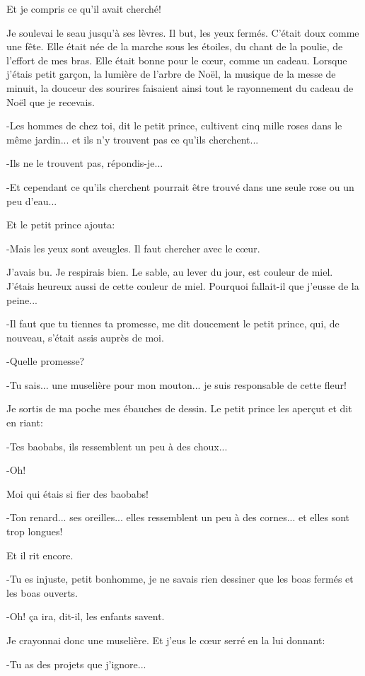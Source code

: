 \documentclass{report}
\begin{document}
Et je compris ce qu'il avait cherché!

Je soulevai le seau jusqu'à ses lèvres. Il but, les yeux fermés. C'était doux comme une fête. Elle était née de la marche sous les étoiles, du chant de la poulie, de l'effort de mes bras. Elle était bonne pour le cœur, comme un cadeau. Lorsque j'étais petit garçon, la lumière de l'arbre de Noël, la musique de la messe de minuit, la douceur des sourires faisaient ainsi tout le rayonnement du cadeau de Noël que je recevais.

-Les hommes de chez toi, dit le petit prince, cultivent cinq mille roses dans le même jardin... et ils n'y trouvent pas ce qu'ils cherchent...

-Ils ne le trouvent pas, répondis-je...

-Et cependant ce qu'ils cherchent pourrait être trouvé dans une seule rose ou un peu d'eau...

Et le petit prince ajouta:

-Mais les yeux sont aveugles. Il faut chercher avec le cœur.

J'avais bu. Je respirais bien. Le sable, au lever du jour, est couleur de miel. J'étais heureux aussi de cette couleur de miel. Pourquoi fallait-il que j'eusse de la peine...

-Il faut que tu tiennes ta promesse, me dit doucement le petit prince, qui, de nouveau, s'était assis auprès de moi.

-Quelle promesse?

-Tu sais... une muselière pour mon mouton... je suis responsable de cette fleur!

Je sortis de ma poche mes ébauches de dessin. Le petit prince les aperçut et dit en riant:

-Tes baobabs, ils ressemblent un peu à des choux...

-Oh!

Moi qui étais si fier des baobabs!

-Ton renard... ses oreilles... elles ressemblent un peu à des cornes... et elles sont trop longues!

Et il rit encore.

-Tu es injuste, petit bonhomme, je ne savais rien dessiner que les boas fermés et les boas ouverts.

-Oh! ça ira, dit-il, les enfants savent.

Je crayonnai donc une muselière. Et j'eus le cœur serré en la lui donnant:

-Tu as des projets que j'ignore...
\end{document}
